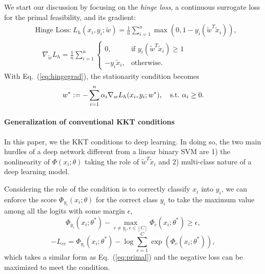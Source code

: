 We start our discussion by focusing on the \textit{hinge loss,} a continuous surrogate loss for the primal feasibility, and its gradient:
\begin{equation}
\begin{split}
&\text{Hinge Loss:} \ L_h(x_i, y_i; \tilde{w}) = \frac{1}{n} \sum_{i=1}^n \max(0, 1 - y_i(\tilde{w}^T \tilde{x}_i)), \\
\label{eq:hingegrad}
& \quad\nabla_{\tilde{w}}  L_h = \frac{1}{n} \sum_{i=1}^n \begin{cases} 0, & \text{if } y_i(\tilde{w}^T \tilde{x}_i) \ge 1 \\ -y_i \tilde{x}_i, & \text{otherwise.} \end{cases}
\end{split}
\end{equation}
%
With Eq.~(\ref{eq:hingegrad}), the stationarity condition  becomes 
\begin{equation}\label{eq:hingesvm}
w^* := -\sum_{i=1}^{n} \alpha_i \nabla_w L_{\textcolor{black}{h}}(x_i, y_i;w^*), \quad \text{s.t.} \  \alpha_i \ge 0.
\end{equation}


\paragraph{Generalization of conventional KKT conditions}

In this paper, we  the KKT conditions %
to deep learning. In doing so, the two main hurdles of a deep network different from a linear binary SVM are 1) the nonlinearity of $\Phi(x_i;\theta)$ taking the role of $\tilde{w}^T \tilde{x}_i$ and 2) multi-class nature of a deep learning model. 


Considering  the role of the  condition is to correctly classify $x_i$ into $y_i$, we can enforce the score $\Phi_{y_i}(x_i;\theta)$ for the correct class $y_i$ to take the maximum value among all the logits with some margin $\epsilon$, \ie 
\begin{equation}
    \Phi_{y_i}(x_i; \theta^*) - \max_{c\neq y_i, c\in [C]} \Phi_{c}(x_i; \theta^*) \ge \epsilon, 
    \label{eq:primal}
\end{equation} 
\begin{equation}
-L_{ce} = \Phi_{y_i}(x_i; \theta^*) - \log \sum_{c=1}^C \exp (\Phi_{c}(x_i; \theta^*)),
\label{eq:primal_ce}
\end{equation}
which takes a similar form as Eq.~(\ref{eq:primal}) and the negative loss can be maximized to meet the condition.


